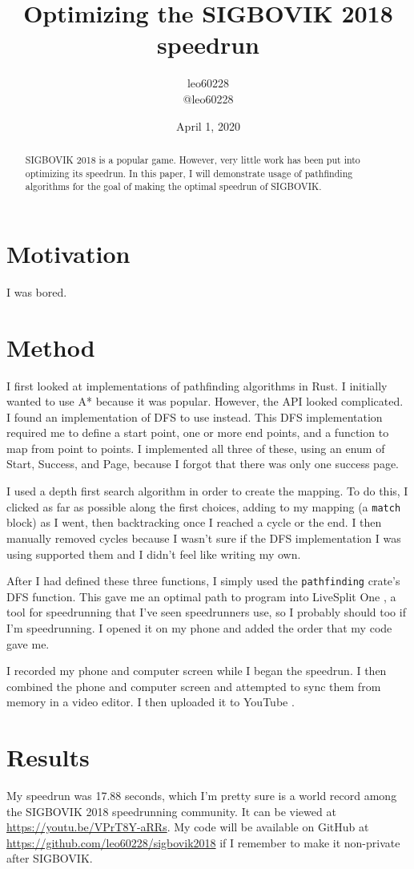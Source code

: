 \documentclass{article}
\title{Optimizing the SIGBOVIK 2018 speedrun}
\author{leo60228  \\
        @leo60228}
\date{April 1, 2020}
\begin{document}
\maketitle
\begin{abstract}
SIGBOVIK 2018 \cite{sigbovik} is a popular game. However, very little work has been put into optimizing its speedrun. In this paper, I will demonstrate usage of pathfinding algorithms for the goal of making the optimal speedrun of SIGBOVIK.
\end{abstract}

\section{Motivation}
I was bored.

\section{Method}
I first looked at implementations of pathfinding algorithms in Rust. I initially wanted to use A* because it was popular. However, the API looked complicated. I found an implementation of DFS to use instead. This DFS implementation required me to define a start point, one or more end points, and a function to map from point to points. I implemented all three of these, using an enum of Start, Success, and Page, because I forgot that there was only one success page.

I used a depth first search algorithm in order to create the mapping. To do this, I clicked as far as possible along the first choices, adding to my mapping (a \texttt{match} block) as I went, then backtracking once I reached a cycle or the end. I then manually removed cycles because I wasn't sure if the DFS implementation I was using supported them and I didn't feel like writing my own.

After I had defined these three functions, I simply used the \texttt{pathfinding} \cite{pathfinding} crate's DFS function. This gave me an optimal path to program into LiveSplit One \cite{livesplit}, a tool for speedrunning that I've seen speedrunners use, so I probably should too if I'm speedrunning. I opened it on my phone and added the order that my code gave me.

I recorded my phone and computer screen while I began the speedrun. I then combined the phone and computer screen and attempted to sync them from memory in a video editor. I then uploaded it to YouTube \cite{youtube}.

\section{Results}
My speedrun was 17.88 seconds, which I'm pretty sure is a world record among the SIGBOVIK 2018 speedrunning community. It can be viewed at \url{https://youtu.be/VPrT8Y-aRRs}. My code will be available on GitHub at \url{https://github.com/leo60228/sigbovik2018} if I remember to make it non-private after SIGBOVIK.
\end{document}
